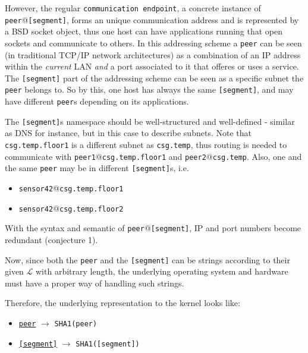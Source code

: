 \documentclass[times,10pt,twocolumn]{article}
\begin{document}
However, the regular \texttt{communication endpoint}, a concrete instance of 
\texttt{peer}@\texttt{[segment]}, forms an unique communication address and 
is represented by a BSD socket object, thus one host can have applications
running that open sockets and communicate to others. In this addressing scheme
a \texttt{peer} can be seen (in traditional TCP/IP network architectures) as 
a combination of an IP address within the \textit{current} LAN \textit{and} 
a port associated to it that offeres or uses a service. The \texttt{[segment]} 
part of the addressing scheme can be seen as a specific subnet the \texttt{peer}
belongs to. So by this, one host has always the same \texttt{[segment]},
and may have different \texttt{peer}s depending on its applications.\newline

The \texttt{[segment]}s namespace should be well-structured and
well-defined - similar as DNS for instance, but in this case to describe
subnets. Note that \texttt{csg.temp.floor1} is a different subnet as
\texttt{csg.temp}, thus routing is needed to communicate
with \texttt{peer1}@\texttt{csg.temp.floor1} and \texttt{peer2}@\texttt{csg.temp}. 
Also, one and the same \texttt{peer} may be in different \texttt{[segment]}s, 
i.e.
\begin{itemize}
	\setlength{\itemsep}{-1mm}
	\item \texttt{sensor42}@\texttt{csg.temp.floor1}
	\item \texttt{sensor42}@\texttt{csg.temp.floor2}
\end{itemize}

With the syntax and semantic of \texttt{peer}@\texttt{[segment]},
IP and port numbers become redundant (conjecture 1).\newline

Now, since both the \texttt{peer} and the \texttt{[segment]} can be strings 
according to their given $\mathcal{L}$ with arbitrary length, the underlying
operating system and hardware must have a proper way of handling such 
strings.\newline

Therefore, the underlying representation to the kernel looks like:
\begin{itemize}
	\setlength{\itemsep}{-1mm}
	\item \underline{\texttt{peer}} $\rightarrow$ \texttt{SHA1(peer)}
	\item \underline{\texttt{[segment]}} $\rightarrow$ \texttt{SHA1([segment])}
\end{itemize}
\end{document}
